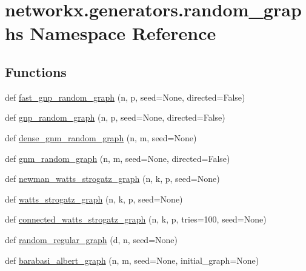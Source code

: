 \hypertarget{namespacenetworkx_1_1generators_1_1random__graphs}{}\section{networkx.\+generators.\+random\+\_\+graphs Namespace Reference}
\label{namespacenetworkx_1_1generators_1_1random__graphs}
\subsection*{Functions}
\begin{DoxyCompactItemize}
\item 
def \hyperlink{namespacenetworkx_1_1generators_1_1random__graphs_a5f6169d8b00ad425259665a725647da0}{fast\+\_\+gnp\+\_\+random\+\_\+graph} (n, p, seed=None, directed=False)
\item 
def \hyperlink{namespacenetworkx_1_1generators_1_1random__graphs_aa7e49cce8e524a491561ad43a9384ba2}{gnp\+\_\+random\+\_\+graph} (n, p, seed=None, directed=False)
\item 
def \hyperlink{namespacenetworkx_1_1generators_1_1random__graphs_a94e5658ef96de443b634239211f06c72}{dense\+\_\+gnm\+\_\+random\+\_\+graph} (n, m, seed=None)
\item 
def \hyperlink{namespacenetworkx_1_1generators_1_1random__graphs_acd29115caef5388f11b7355b35d55815}{gnm\+\_\+random\+\_\+graph} (n, m, seed=None, directed=False)
\item 
def \hyperlink{namespacenetworkx_1_1generators_1_1random__graphs_a7f077c520e2edc1908f42e3707d08878}{newman\+\_\+watts\+\_\+strogatz\+\_\+graph} (n, k, p, seed=None)
\item 
def \hyperlink{namespacenetworkx_1_1generators_1_1random__graphs_aca1f368d62c5650afc68863ab7ed28bd}{watts\+\_\+strogatz\+\_\+graph} (n, k, p, seed=None)
\item 
def \hyperlink{namespacenetworkx_1_1generators_1_1random__graphs_ad8d78607ea86a214a610adb9be19cf2d}{connected\+\_\+watts\+\_\+strogatz\+\_\+graph} (n, k, p, tries=100, seed=None)
\item 
def \hyperlink{namespacenetworkx_1_1generators_1_1random__graphs_aa86e296ac7fc47fccf09fd74467bd98c}{random\+\_\+regular\+\_\+graph} (d, n, seed=None)
\item 
def \hyperlink{namespacenetworkx_1_1generators_1_1random__graphs_a63f97442c23048bd6806f4a1d13ee373}{barabasi\+\_\+albert\+\_\+graph} (n, m, seed=None, initial\+\_\+graph=None)

\end{DoxyCompactItemize}
